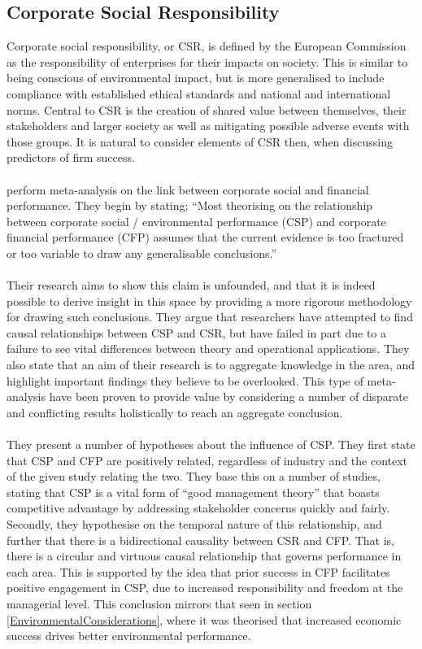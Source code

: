 \subsection{Corporate Social Responsibility} \label{CorporateSocialResponsibility}
{Corporate social responsibility, or CSR, is defined by the European Commission as the responsibility of enterprises for their impacts on society. This is similar to being conscious of environmental impact, but is more generalised to include compliance with established ethical standards and national and international norms. Central to CSR is the creation of shared value between themselves, their stakeholders and larger society as well as mitigating possible adverse events with those groups. It is natural to consider elements of CSR then, when discussing predictors of firm success. \\\\
\cite{orlitzky2003corporate} perform meta-analysis on the link between corporate social and financial performance. They begin by stating;
``Most theorising on the relationship between corporate social / environmental performance (CSP) and corporate financial performance (CFP) assumes that the current evidence is too fractured or too variable to draw any generalisable conclusions.''  \cite{orlitzky2003corporate}\\\\
Their research aims to show this claim is unfounded, and that it is indeed possible to derive insight in this space by providing a more rigorous methodology for drawing such conclusions. They argue that researchers have attempted to find causal relationships between CSP and CSR, but have failed in part due to a failure to see vital differences between theory and operational applications. They also state that an aim of their research is to aggregate knowledge in the area, and highlight important findings they believe to be overlooked. This type of meta-analysis have been proven to provide value by considering a number of disparate and conflicting results holistically to reach an aggregate conclusion.\\\\
They present a number of hypotheses about the influence of CSP. They first state that CSP and CFP are positively related, regardless of industry and the context of the given study relating the two. They base this on a number of studies, stating that CSP is a vital form of ``good management theory'' that boasts competitive advantage by addressing stakeholder concerns quickly and fairly.  Secondly, they hypothesise on the temporal nature of this relationship, and further that there is a bidirectional causality between CSR and CFP. That is, there is a circular and virtuous causal relationship that governs performance in each area. This is supported by the idea that prior success in CFP facilitates positive engagement in CSP, due to increased responsibility and freedom at the managerial level. This conclusion mirrors that seen in section \ref{EnvironmentalConsiderations}, where it was theorised that increased economic success drives better environmental performance.\\\\
}

